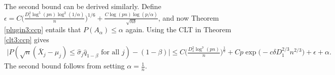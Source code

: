\documentclass[mnsc,blindrev]{informs4} %
\begin{document}
The second bound can be derived similarly. Define $\epsilon=C\Big(\frac{D_1^2\log^5(pn)\log^2(1/\alpha)}{n}\Big)^{1/6}+\frac{C\log(pn)\log(p/\alpha)}{\sqrt{n\delta}}$, and now Theorem \ref{plugin3:ccp} entails that $P(A_{\alpha})\leq \alpha$ again. Using the CLT in Theorem \ref{clt3:ccp} gives
\begin{align*}
\lvert P(\sqrt n(\bar{X}_j-\mu_j)\leq \hat\sigma_j\hat q_{1-\beta}\text{ for all }j)-(1-\beta)\rvert\leq C\Big(\frac{D_1^2\log^7(pn)}{n}\Big)^{\frac{1}{6}}+Cp\exp\big(-c\delta D_1^{2/3}n^{2/3}\big)+\epsilon+\alpha.
\end{align*}
The second bound follows from setting $\alpha=\frac{1}{n}$.\hfill\Halmos

\end{document}

